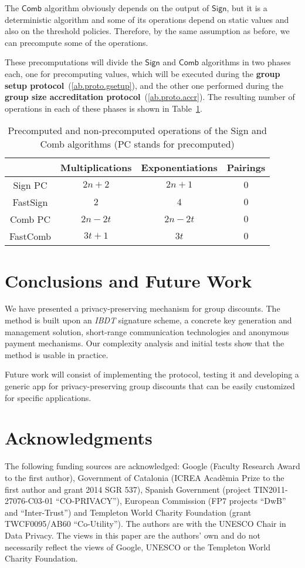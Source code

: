 \documentclass[11pt]{llncs}
\def\Sign{\mathsf{Sign}}
\def\Comb{\mathsf{Comb}}
\begin{document}
The $\Comb$ algorithm obviously depends on the output
of $\Sign$, but it is a deterministic algorithm and some of
its operations depend on static values and also on the
threshold policies. Therefore, by the same assumption
as before, we can precompute some of the operations.

These precomputations will divide the $\Sign$ and $\Comb$
algorithms in two phases each, one for precomputing
values, which will be executed during the \textbf{group setup protocol}~(\ref{ab.proto.gsetup}),
and the other one performed during the \textbf{group size accreditation protocol}~(\ref{ab.proto.accr}).
The resulting number of operations in each of
these phases is shown in Table~\ref{ab.tab.ibdttimesprec}.

\begin{table}[!h]
\renewcommand{\arraystretch}{1.3}
\caption{Precomputed and non-precomputed
operations of the Sign and Comb algorithms (PC stands for
precomputed)} \label{ab.tab.ibdttimesprec}
\centering
\begin{tabular}{c||c||c||c}
\hline
& \bfseries Multiplications & \bfseries Exponentiations & \bfseries Pairings \\
\hline
\hline
Sign PC & $2n+2$ & $2n+1$ & $0$ \\
FastSign & $2$ & $4$ & $0$ \\
Comb PC & $2n-2t$ & $2n-2t$ & $0$ \\
FastComb & $3t+1$ & $3t$ & $0$ \\
\hline
\end{tabular}
\end{table}




\section{Conclusions and Future Work} \label{ab.sec.conclusions}
We have presented a privacy-preserving
mechanism for group discounts.
The method is built upon an \emph{IBDT} signature scheme,
a concrete key generation and management solution, short-range
communication technologies and anonymous payment mechanisms.
Our complexity analysis and initial tests show that the method 
is usable in practice.

Future work will consist of implementing
the protocol, testing it and 
developing a generic app for privacy-preserving group discounts that can be easily
customized for specific applications.


\section*{Acknowledgments}
The following funding sources are acknowledged:
Google (Faculty Research Award to the first author), 
Government of Catalonia (ICREA Acad\`emia Prize to the 
first author and grant 2014 SGR 537),
Spanish Government (project TIN2011-27076-C03-01 ``CO-PRIVACY''),
European Commission (FP7 projects
``DwB'' and ``Inter-Trust'') and Templeton World Charity
Foundation (grant TWCF0095/AB60 ``Co-Utility'').
The authors are with the UNESCO Chair in Data Privacy.
The views in this paper are the authors' own and 
do not necessarily reflect
the views of Google, UNESCO or the Templeton World Charity
Foundation.
\end{document}
